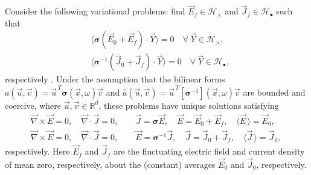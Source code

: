 \documentclass[english,12pt,jmp,graphicx]{revtex4-1}
\begin{document}
Consider the following variational problems: 
find $\vec{E}_f\in\mathscr{H}_\times$ and  $\vec{J}_f\in \mathscr{H}_{\bullet}$ such
that    
%
\begin{align}
  \label{eq:Weak_Curl_Free_Variational_Form}
 &\langle\bm{\sigma}(\vec{E}_0+\vec{E}_f)\cdot\vec{Y}\rangle=0 \quad  \forall \
  \vec{Y}\in\mathscr{H}_\times,\\
%
  \label{eq:Weak_Div_Free_Variational_Form}
 &\langle\bm{\sigma}^{-1}(\vec{J}_0+\vec{J}_f)\cdot\vec{Y}\rangle=0 \quad  \forall \
  \vec{Y}\in\mathscr{H}_{\bullet},  
\end{align}
%
respectively \cite{Golden:CMP-473}. Under the assumption that the
bilinear forms
$a(\vec{u},\vec{v})=\vec{u}^{\,T}\bm{\sigma}(\vec{x},\omega)\vec{v}$ and
$\hat{a}(\vec{u},\vec{v})=\vec{u}^{\,T}[\bm{\sigma}^{-1}](\vec{x},\omega)\vec{v}$
are bounded and coercive, where $\vec{u},\vec{v}\in\mathbb{R}^d$, these
problems have unique solutions satisfying \cite{Golden:CMP-473} 
%
\begin{align}
  \label{eq:Maxwells_Equations_E}  
  &\vec{\nabla}\times\vec{E}=0, \quad
  \vec{\nabla}\cdot\vec{J}=0,\qquad 
  \vec{J}=\bm{\sigma}\vec{E},\quad
  \vec{E}=\vec{E}_0+\vec{E}_f, \quad
  \langle\vec{E}\,\rangle=\vec{E}_0,\\
%
  \label{eq:Maxwells_Equations_D}
   &\vec{\nabla}\times\vec{E}=0, \quad
   \vec{\nabla}\cdot\vec{J}=0, \qquad
   \vec{E}=\bm{\sigma}^{-1}\vec{J},\quad   
   \vec{J}=\vec{J}_0+\vec{J}_f,\quad
   \langle\vec{J}\,\rangle=\vec{J}_0,\quad
\end{align}
%
respectively. Here $\vec{E}_f$ and $\vec{J}_f$ are the fluctuating
electric field and current density of mean zero, respectively, about the
(constant) averages $\vec{E}_0$ and $\vec{J}_0$, respectively. 
\end{document}
